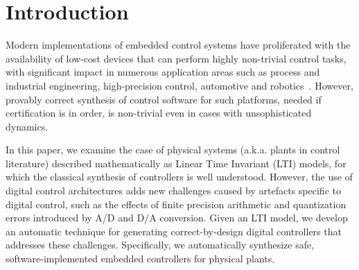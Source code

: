\section{Introduction}

Modern implementations of embedded control systems have proliferated
with the availability of low-cost devices that can perform highly
non-trivial control tasks, with significant impact in numerous
application areas such as process and industrial engineering, high-precision control, 
automotive and robotics~\cite{astrom1997computer, Franklin15}.  
However, provably correct synthesis of control software for such platforms, 
needed if certification is in order, is non-trivial even in cases with unsophisticated dynamics. 

In this paper, we examine the case of physical systems (a.k.a. plants in control literature) described mathematically as 
Linear Time Invariant (LTI) models, for which the classical synthesis of controllers is well understood.
However, the use of digital control architectures adds new challenges
caused by artefacts specific to digital control, such as the effects
of finite precision arithmetic and quantization
errors introduced by A/D and D/A conversion.
%
Given an LTI model, we develop an automatic technique for generating
correct-by-design digital controllers that addresses these challenges. 
Specifically, we automatically synthesize %
safe,
software-implemented embedded controllers for physical plants.   




